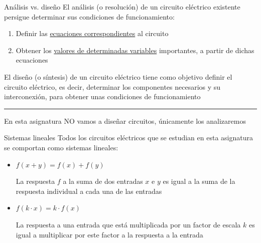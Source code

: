 \documentclass[aspectratio=169, xcolor={usenames,svgnames,dvipsnames}]{beamer}
\begin{document}

\begin{frame}{Análisis vs. diseño}
    El \alert{análisis} (o resolución) de un circuito eléctrico existente persigue determinar sus condiciones de funcionamiento:
    \begin{enumerate}
    \item Definir las \underline{ecuaciones correspondientes} al circuito

    \vspace{2mm}
    \item Obtener los \underline{valores de determinadas variables} importantes, a partir de dichas ecuaciones
    \end{enumerate}
    
    \vspace{6mm}
    
    El \alert{diseño} (o síntesis) de un circuito eléctrico tiene como objetivo definir el circuito eléctrico, es decir, determinar los componentes necesarios y su interconexión, para obtener unas condiciones de funcionamiento

    \vspace{1mm}
    
    \noindent\rule{\textwidth}{0.5pt}

    \vspace{1mm}
    
    En esta asignatura \alert{NO} vamos a diseñar circuitos, únicamente \alert{los analizaremos}
\end{frame}


\begin{frame}{Sistemas lineales}
    Todos los circuitos eléctricos que se estudian en esta asignatura se comportan como \alert{sistemas lineales}: 
    
    \vspace{5mm}
    \begin{itemize}
    \item \(f(x + y) = f(x) + f(y)\)
    
    La respuesta \(f\) a la suma de dos entradas \(x\) e \(y\) es igual a la suma de la respuesta individual a cada una de las entradas
    
    \vspace{5mm}
    \item \(f(k \cdot x) = k \cdot f(x)\)
    
    La respuesta a una entrada que está multiplicada por un factor de escala \(k\) es igual a multiplicar por este factor a la respuesta a la entrada
    \end{itemize}
\end{frame}
\end{document}
